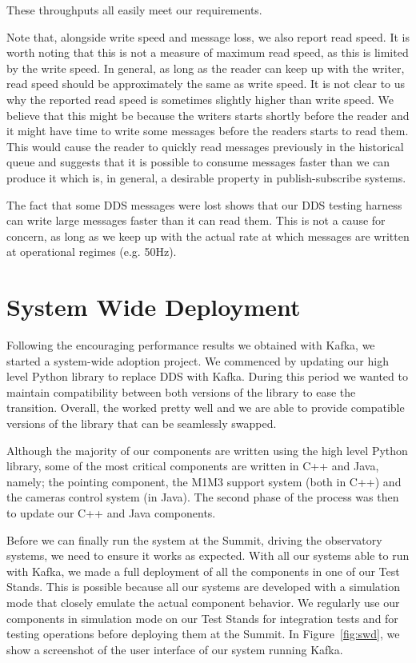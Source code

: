 \documentclass[]{spie}  %
\begin{document}
These throughputs all easily meet our requirements.

Note that, alongside write speed and message loss, we also report read speed.
It is worth noting that this is not a measure of maximum read speed, as this is limited by the write speed.
In general, as long as the reader can keep up with the writer, read speed should be approximately the same as write speed.
It is not clear to us why the reported read speed is sometimes slightly higher than write speed.
We believe that this might be because the writers starts shortly before the reader and it might have time to write some messages before the readers starts to read them.
This would cause the reader to quickly read messages previously in the historical queue and suggests that it is possible to consume messages faster than we can produce it which is, in general, a desirable property in publish-subscribe systems.

The fact that some DDS messages were lost shows that our DDS testing harness can write large messages faster than it can read them.
This is not a cause for concern, as long as we keep up with the actual rate at which messages are written at operational regimes (e.g. 50Hz).

\section{System Wide Deployment}
\label{sec:swd}

Following the encouraging performance results we obtained with Kafka, we started a system-wide adoption project.
We commenced by updating our high level Python library to replace DDS with Kafka.
During this period we wanted to maintain compatibility between both versions of the library to ease the transition.
Overall, the worked pretty well and we are able to provide compatible versions of the library that can be seamlessly swapped.

Although the majority of our components are written using the high level Python library, some of the most critical components are written in C++ and Java, namely; the pointing component, the M1M3 support system (both in C++) and the cameras control system (in Java).
The second phase of the process was then to update our C++ and Java components.

Before we can finally run the system at the Summit, driving the observatory systems, we need to ensure it works as expected.
With all our systems able to run with Kafka, we made a full deployment of all the components in one of our Test Stands.
This is possible because all our systems are developed with a simulation mode that closely emulate the actual component behavior.
We regularly use our components in simulation mode on our Test Stands for integration tests and for testing operations before deploying them at the Summit.
In Figure~\ref{fig:swd}, we show a screenshot of the user interface of our system running Kafka.
\end{document}
